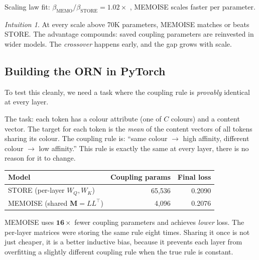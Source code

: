 \documentclass[11pt, a4paper]{article}
\newcommand{\M}{\mathbf{M}}
\theoremstyle{remark}
\newtheorem*{intuition}{Intuition}
\begin{document}
Scaling law fit: $\beta_{\text{MEMO}} / \beta_{\text{STORE}} = 1.02\times$ ,  MEMOISE scales faster per parameter.

\begin{intuition}
At every scale above 70K parameters, MEMOISE matches or beats STORE.
The advantage compounds: saved coupling parameters are reinvested in wider models.
The \emph{crossover} happens early, and the gap grows with scale.
\end{intuition}

\subsection{Building the ORN in PyTorch}
\label{sec:grn:code}
To test this cleanly, we need a task where the coupling rule is \emph{provably} identical at every layer.

The task: each token has a colour attribute (one of $C$ colours) and a content vector.
The target for each token is the \emph{mean} of the content vectors of all tokens sharing its colour.
The coupling rule is: ``same colour $\to$ high affinity, different colour $\to$ low affinity.''
This rule is exactly the same at every layer, there is no reason for it to change.

\begin{center}\small
\renewcommand{\arraystretch}{1.2}
\begin{tabular}{@{}lrr@{}}
\toprule
\textbf{Model} & \textbf{Coupling params} & \textbf{Final loss} \\
\midrule
STORE (per-layer $W_Q, W_K$) & 65{,}536 & 0.2090 \\
MEMOISE (shared $\M = LL^\top$) & 4{,}096 & 0.2076 \\
\bottomrule
\end{tabular}
\end{center}

\noindent
MEMOISE uses $\mathbf{16\times}$ fewer coupling parameters and achieves \emph{lower} loss.
The per-layer matrices were storing the same rule eight times.
Sharing it once is not just cheaper, it is a better inductive bias, because it prevents each layer from overfitting a slightly different coupling rule when the true rule is constant.
\end{document}
